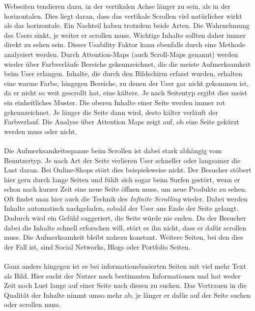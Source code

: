 Webseiten tendieren dazu, in der vertikalen Achse länger zu sein, als in der horizontalen. Dies liegt daran, dass das vertikale Scrollen viel natürlicher wirkt als das horizontale. Ein Nachteil haben trotzdem beide Arten. Die Wahrnehmung des Users sinkt, je weiter er scrollen muss. Wichtige Inhalte sollten daher immer direkt zu sehen sein. Dieser Usability Faktor kann ebenfalls durch eine Methode analysiert werden. Durch Attention-Maps (auch Scroll-Maps genannt) werden wieder über Farbverläufe Bereiche gekennzeichnet, die die meiste Aufmerksamkeit beim User erlangen. Inhalte, die durch den Bildschirm erfasst wurden, erhalten eine warme Farbe, hingegen Bereiche, zu denen der User gar nicht gekommen ist, da er nicht so weit gescrollt hat, eine kältere. Je nach Seitentyp ergibt dies meist ein einheitliches Muster. Die oberen Inhalte einer Seite werden immer rot gekennzeichnet. Je länger die Seite dann wird, desto kälter verläuft der Farbverlauf. Die Analyse über Attention Maps zeigt auf, ob eine Seite gekürzt werden muss oder nicht.\\
\\
Die Aufmerksamkeitsspanne beim Scrollen ist dabei stark abhängig vom Benutzertyp. Je nach Art der Seite verlieren User schneller oder langsamer die Lust daran. Bei Online-Shops stört dies beispielsweise nicht. Der Besucher stöbert hier gern durch lange Seiten und fühlt sich sogar beim Surfen gestört, wenn er schon nach kurzer Zeit eine neue Seite öffnen muss, um neue Produkte zu sehen. Oft findet man hier auch die Technik des \textit{Infinite Scrolling} wieder. Dabei werden Inhalte automatisch nachgeladen, sobald der User ans Ende der Seite gelangt. Dadurch wird ein Gefühl suggeriert, die Seite würde nie enden. Da der Besucher dabei die Inhalte schnell erforschen will, stört es ihn nicht, dass er dafür scrollen muss. Die Aufmerksamkeit bleibt nahezu konstant. Weitere Seiten, bei den dies der Fall ist, sind Social Networks, Blogs oder Portfolio Seiten.\\
\\
Ganz anders hingegen ist es bei informationsbasierten Seiten mit viel mehr Text als Bild. Hier sucht der Nutzer nach bestimmten Informationen und hat weder Zeit noch Lust lange auf einer Seite nach diesen zu suchen. Das Vertrauen in die Qualität der Inhalte nimmt umso mehr ab, je länger er dafür auf der Seite suchen oder scrollen muss.